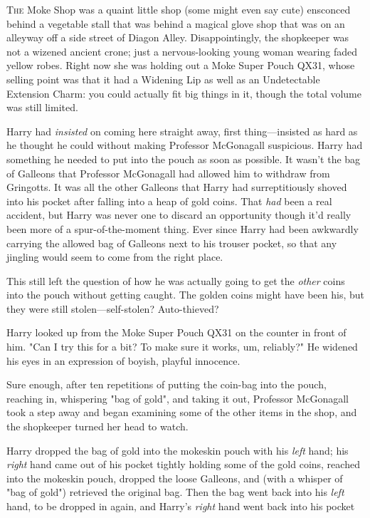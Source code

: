 
\lettrine{T}{he} Moke Shop was a quaint little shop (some might even say cute) ensconced
behind a vegetable stall that was behind a magical glove shop that was on an
alleyway off a side street of Diagon Alley. Disappointingly, the shopkeeper was
not a wizened ancient crone; just a nervous-looking young woman wearing faded
yellow robes. Right now she was holding out a Moke Super Pouch QX31, whose
selling point was that it had a Widening Lip as well as an Undetectable
Extension Charm: you could actually fit big things in it, though the total
volume was still limited.

Harry had \emph{insisted} on coming here straight away, first thing---insisted
as hard as he thought he could without making Professor McGonagall suspicious.
Harry had something he needed to put into the pouch as soon as possible. It
wasn't the bag of Galleons that Professor McGonagall had allowed him to
withdraw from Gringotts. It was all the other Galleons that Harry had
surreptitiously shoved into his pocket after falling into a heap of gold coins.
That \emph{had} been a real accident, but Harry was never one to discard an
opportunity{\el} though it'd really been more of a\pagebreak{} spur-of-the-moment thing.
Ever since Harry had been awkwardly carrying the allowed bag of Galleons next
to his trouser pocket, so that any jingling would seem to come from the right
place.

This still left the question of how he was actually going to get the
\emph{other} coins into the pouch without getting caught. The golden coins
might have been his, but they were still stolen---self-stolen? Auto-thieved?

Harry looked up from the Moke Super Pouch QX31 on the counter in front of him.
"Can I try this for a bit? To make sure it works, um, reliably?" He widened his
eyes in an expression of boyish, playful innocence.

Sure enough, after ten repetitions of putting the coin-bag into the pouch,
reaching in, whispering "bag of gold", and taking it out, Professor McGonagall
took a step away and began examining some of the other items in the shop, and
the shopkeeper turned her head to watch.

Harry dropped the bag of gold into the mokeskin pouch with his \emph{left}
hand; his \emph{right} hand came out of his pocket tightly holding some of the
gold coins, reached into the mokeskin pouch, dropped the loose Galleons, and
(with a whisper of "bag of gold") retrieved the original bag. Then the bag went
back into his \emph{left} hand, to be dropped in again, and Harry's
\emph{right} hand went back into his pocket{\el}

